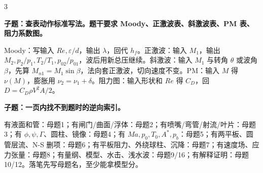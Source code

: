 \documentclass[a4paper]{article}
\newcommand{\qt}[1]{\vspace{0.25pt}\colorbox{Q}{\parbox{\dimexpr\linewidth-2\fboxsep}{\color{white}\bfseries #1}}\par}
\newcommand{\ans}[1]{\colorbox{G}{\parbox{\dimexpr\linewidth-2\fboxsep}{#1}}\par}
\begin{document}
\begin{multicols}{3}
\qt{子题：查表动作标准写法。题干要求 Moody、正激波表、斜激波表、PM 表、阻力系数图。}
\ans{Moody：写输入 $Re,\varepsilon/d$，输出 $\lambda$，回代 $h_f$。正激波：输入 $M_1$，输出 $M_2,p_2/p_1,T_2/T_1,p_{02}/p_{01}$，波后用新总压继续。斜激波：输入 $M_1$ 与转角 $\theta$ 或波角 $\beta$，先算 $M_{n1}=M_1\sin\beta$，法向套正激波，切向速度不变。PM：输入 $M$ 得 $\nu(M)$，膨胀用 $\nu_2=\nu_1+\delta$。阻力图：输入形状和 $Re$ 得 $C_D$，回 $D=C_D\rho V^2A/2$。}
\qt{子题：一页内找不到题时的逆向索引。}
\ans{有液面和管：母题1；有闸门/曲面/浮体：母题2；有喷嘴/弯管/射流/叶片：母题3；有 $\phi,\psi,\Gamma$、圆柱、镜像：母题4；有 $Ma,p_0,T_0,A^*,p_b$：母题5；有两平板、圆管层流、N-S 删项：母题6；有平板阻力、外绕球柱、沉降：母题7；有速度场、应力张量：母题8；有量纲、模型、水击、浅水波：母题9/16；有解释证明：母题10/12。落笔先写母题名，至少能拿模型分。}


\end{multicols}
\end{document}
